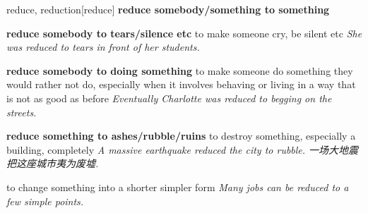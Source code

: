 \begin{DefWord}{reduce, reduction}[reduce]
    \textbf{reduce somebody/something to something}

    \textbf{reduce somebody to tears/silence etc} to make someone cry, be silent etc
    \textit{She was reduced to tears in front of her students.}

    \textbf{reduce somebody to doing something} to make someone do something they would rather not do, especially when it involves behaving or living in a way that is not as good as before
    \textit{Eventually Charlotte was reduced to begging on the streets.}

    \textbf{reduce something to ashes/rubble/ruins}
    to destroy something, especially a building, completely
    \textit{A massive earthquake reduced the city to rubble. 一场大地震把这座城市夷为废墟. }

    to change something into a shorter simpler form
    \textit{Many jobs can be reduced to a few simple points.}
\end{DefWord}
